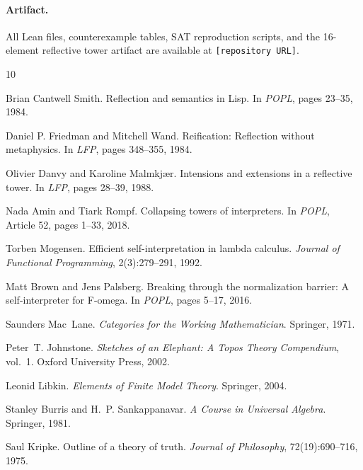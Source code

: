 \documentclass[sigconf,screen,review,anonymous]{acmart}
\begin{document}
\paragraph{Artifact.}
All Lean files, counterexample tables, SAT reproduction scripts, and the 16-element reflective tower artifact are available at \texttt{[repository URL]}.


\begin{thebibliography}{10}

Brian Cantwell Smith.
\newblock Reflection and semantics in {Lisp}.
\newblock In \emph{POPL}, pages 23--35, 1984.

Daniel P. Friedman and Mitchell Wand.
\newblock Reification: Reflection without metaphysics.
\newblock In \emph{LFP}, pages 348--355, 1984.

Olivier Danvy and Karoline Malmkj{\ae}r.
\newblock Intensions and extensions in a reflective tower.
\newblock In \emph{LFP}, pages 28--39, 1988.

Nada Amin and Tiark Rompf.
\newblock Collapsing towers of interpreters.
\newblock In \emph{POPL}, Article 52, pages 1--33, 2018.

Torben Mogensen.
\newblock Efficient self-interpretation in lambda calculus.
\newblock \emph{Journal of Functional Programming}, 2(3):279--291, 1992.

Matt Brown and Jens Palsberg.
\newblock Breaking through the normalization barrier: A self-interpreter for {F-omega}.
\newblock In \emph{POPL}, pages 5--17, 2016.

Saunders Mac~Lane.
\newblock \emph{Categories for the Working Mathematician}.
\newblock Springer, 1971.

Peter~T. Johnstone.
\newblock \emph{Sketches of an Elephant: A Topos Theory Compendium}, vol.~1.
\newblock Oxford University Press, 2002.

Leonid Libkin.
\newblock \emph{Elements of Finite Model Theory}.
\newblock Springer, 2004.

Stanley Burris and H.~P. Sankappanavar.
\newblock \emph{A Course in Universal Algebra}.
\newblock Springer, 1981.

Saul Kripke.
\newblock Outline of a theory of truth.
\newblock \emph{Journal of Philosophy}, 72(19):690--716, 1975.


\end{thebibliography}
\end{document}
